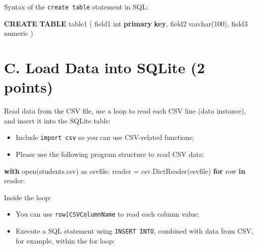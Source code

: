 \documentclass[
  letterpaper,
]{scrbook}
\newenvironment{Shaded}{\begin{snugshade}}{\end{snugshade}}
\newcommand{\BuiltInTok}[1]{\textcolor[rgb]{0.00,0.23,0.31}{#1}}
\newcommand{\ControlFlowTok}[1]{\textcolor[rgb]{0.00,0.23,0.31}{\textbf{#1}}}
\newcommand{\DataTypeTok}[1]{\textcolor[rgb]{0.68,0.00,0.00}{#1}}
\newcommand{\DecValTok}[1]{\textcolor[rgb]{0.68,0.00,0.00}{#1}}
\newcommand{\ImportTok}[1]{\textcolor[rgb]{0.00,0.46,0.62}{#1}}
\newcommand{\KeywordTok}[1]{\textcolor[rgb]{0.00,0.23,0.31}{\textbf{#1}}}
\newcommand{\NormalTok}[1]{\textcolor[rgb]{0.00,0.23,0.31}{#1}}
\newcommand{\OperatorTok}[1]{\textcolor[rgb]{0.37,0.37,0.37}{#1}}
\newcommand{\StringTok}[1]{\textcolor[rgb]{0.13,0.47,0.30}{#1}}
\begin{document}
Syntax of the \texttt{create\ table} statement in SQL:

\begin{Shaded}
\begin{Highlighting}[]
\KeywordTok{CREATE} \KeywordTok{TABLE}\NormalTok{ table1 (}
\NormalTok{    field1 }\DataTypeTok{int} \KeywordTok{primary} \KeywordTok{key}\NormalTok{, }
\NormalTok{    field2 }\DataTypeTok{varchar}\NormalTok{(}\DecValTok{100}\NormalTok{),}
\NormalTok{    field3 }\DataTypeTok{numeric}
\NormalTok{)}
\end{Highlighting}
\end{Shaded}

\section*{C. Load Data into SQLite (2
points)}\label{c.-load-data-into-sqlite-2-points}


Read data from the CSV file, use a loop to read each CSV line (data
instance), and insert it into the SQLite table:

\begin{itemize}
\item
  Include \texttt{import\ csv} so you can use CSV-related functions;
\item
  Please use the following program structure to read CSV data:
\end{itemize}

\begin{Shaded}
\begin{Highlighting}[]
\ControlFlowTok{with} \BuiltInTok{open}\NormalTok{(}\StringTok{\textquotesingle{}students.csv\textquotesingle{}}\NormalTok{) }\ImportTok{as}\NormalTok{ csvfile:}
\NormalTok{    reader }\OperatorTok{=}\NormalTok{ csv.DictReader(csvfile)}
    \ControlFlowTok{for}\NormalTok{ row }\KeywordTok{in}\NormalTok{ reader:}
\end{Highlighting}
\end{Shaded}

Inside the loop:

\begin{itemize}
\item
  You can use
  \texttt{row{[}\textquotesingle{}CSVColumnName\textquotesingle{}{]}} to
  read each column value;
\item
  Execute a SQL statement using \texttt{INSERT\ INTO}, combined with
  data from CSV, for example, within the for loop:
\end{itemize}
\end{document}
